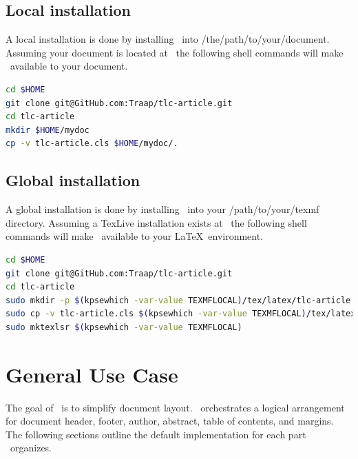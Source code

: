 \documentclass[12pt]{tlc-article}
\begin{document}

\subsection{Local installation}
A local installation is done by installing \tlcA\ into
/the/path/to/your/document.  Assuming your document is located at \tlcMyDoc\ the
following shell commands will make \tlcA\ available to your document.

\begin{lstlisting}[language=bash]
cd $HOME
git clone git@GitHub.com:Traap/tlc-article.git
cd tlc-article
mkdir $HOME/mydoc
cp -v tlc-article.cls $HOME/mydoc/.
\end{lstlisting}


\clearpage
\subsection{Global installation}
A global installation is done by installing \tlcA\ into your /path/to/your/texmf
directory.  Assuming a TexLive installation exists at \texDist\ the following
shell commands will make \tlcA\ available to your \LaTeX\ environment.

\begin{lstlisting}[language=bash]
cd $HOME
git clone git@GitHub.com:Traap/tlc-article.git
cd tlc-article
sudo mkdir -p $(kpsewhich -var-value TEXMFLOCAL)/tex/latex/tlc-article
sudo cp -v tlc-article.cls $(kpsewhich -var-value TEXMFLOCAL)/tex/latex/tlc-article/.
sudo mktexlsr $(kpsewhich -var-value TEXMFLOCAL)
\end{lstlisting}

\tlcVspace

%


\clearpage
\section{General Use Case}
The goal of \tlcA\ is to simplify document layout.  \tlcA\ orchestrates a
logical arrangement for document header, footer, author, abstract, table of
contents, and margins.  The following sections outline the default
implementation for each part \tlcA\ organizes.
\end{document}

